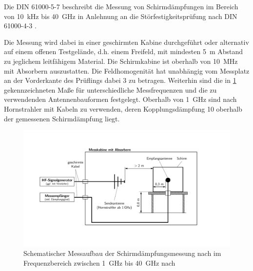 Die DIN 61000-5-7 \cite{DIN_EN_61000-5-7} beschreibt die Messung von Schirmdämpfungen im Bereich von \SI{10}{\kilo\hertz} bis \SI{40}{\giga\hertz} in Anlehnung an die Störfestigkeitsprüfung nach DIN 61000-4-3 \cite{DIN_EN_61000-4-3}.
\par
\vspace{\linespace}
Die Messung wird dabei in einer geschirmten Kabine durchgeführt oder alternativ auf einem offenen Testgelände, d.h. einem Freifeld, mit mindesten \SI{5}{\meter} Abstand zu jeglichem leitfähigem Material. Die Schirmkabine ist oberhalb von \SI{10}{\mega\hertz} mit Absorbern auszustatten. Die Feldhomogenität hat unabhängig vom Messplatz an der Vorderkante des Prüflings dabei \SI{3}{\Dezibel} zu betragen. Weiterhin sind die in \Abb\ref{fig:2_Schematik_Schirmdaempfungsmessung_DIN_61000-5-7} gekennzeichneten Maße für unterschiedliche Messfrequenzen und die zu verwendenden Antennenbauformen festgelegt. Oberhalb von \SI{1}{\giga\hertz} sind nach~\cite{DIN_EN_61000-5-7} Hornstrahler mit Kabeln zu verwenden, deren Kopplungsdämpfung \SI{10}{\Dezibel} oberhalb der gemessenen Schirmdämpfung liegt.


\begin{figure}[ht]
    \centering
    \includegraphics[page = 1, trim = 2cm 3cm 5cm 3cm, clip, width=.9\textwidth]{Abbildungen/Kapitel2/Schematiken_Schirmdaempfungsmessung.pdf}
    \caption[Schematischer Messaufbau der Schirmdämpfungsmessung nach \citeauthor{DIN_EN_61000-5-7} im Frequenzbereich zwischen \SI{1}{\giga\hertz} bis \SI{40}{\giga\hertz}]{Schematischer Messaufbau der Schirmdämpfungsmessung nach \citeauthor{DIN_EN_61000-5-7} im Frequenzbereich zwischen \SI{1}{\giga\hertz} bis \SI{40}{\giga\hertz} nach~\cite{DIN_EN_61000-5-7}}
    \label{fig:2_Schematik_Schirmdaempfungsmessung_DIN_61000-5-7}
\end{figure}



